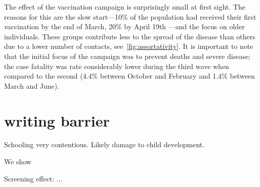 The effect of the vaccination campaign is surprisingly small at first sight. The reasons
for this are the slow start---10\% of the population had received their first vaccination
by the end of March, %
20\% by April 19th ---and the focus on older individuals. These groups contribute less to
the spread of the disease than others due to a lower number of contacts,
see~\ref{fig:assortativity}. It is important to note that the initial focus of the
campaign was to prevent deaths and severe disease; the case fatality was rate
considerably lower during the third wave when compared to the second (4.4\% between
October and February and 1.4\% between March and June).


\clearpage

\section*{writing barrier}

Schooling very contentious. Likely damage to child development.

We show

Screening effect: ...


